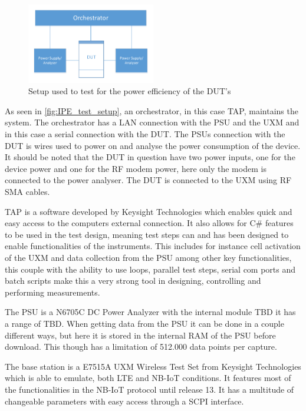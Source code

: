 \begin{figure}[H]
\centering
\includegraphics[width=0.5\textwidth]{figures/IPE_test_setup.pdf}
\caption{Setup used to test for the power efficiency of the \gls{DUT}'s}
\label{fig:IPE_test_setup}
\end{figure}


As seen in \autoref{fig:IPE_test_setup}, an orchestrator, in this case \gls{TAP}, maintains the system. The orchestrator has a \gls{LAN} connection with the \gls{PSU} and the UXM and in this case a serial connection with the DUT. The \gls{PSU}s connection with the DUT is wires used to power on and analyse the power consumption of the device. It should be noted that the \gls{DUT} in question have two power inputs, one for the device power and one for the RF modem power, here only the modem is connected to the power analyser. The DUT is connected to the UXM using RF SMA cables.

\gls{TAP} is a software developed by Keysight Technologies which enables quick and easy access to the computers external connection. It also allows for C\# features to be used in the test design, meaning test steps can and has been designed to enable functionalities of the instruments. This includes for instance cell activation of the UXM and data collection from the PSU among other key functionalities, this couple with the ability to use loops, parallel test steps, serial com ports and batch scripts make this a very strong tool in designing, controlling and performing measurements. \citep{TAP} 

The \gls{PSU} is a N6705C DC Power Analyzer with the internal module TBD it has a range of TBD. When getting data from the PSU it can be done in a couple different ways, but here it is stored in the internal RAM of the PSU before download. This though has a limitation of 512.000 data points per capture. \citep{PSU}

The base station is a E7515A UXM Wireless Test Set from Keysight Technologies which is able to emulate, both LTE and NB-IoT conditions. It features most of the functionalities in the NB-IoT protocol until release 13. It has a multitude of changeable parameters with easy access through a SCPI interface. \citep{UXM}

